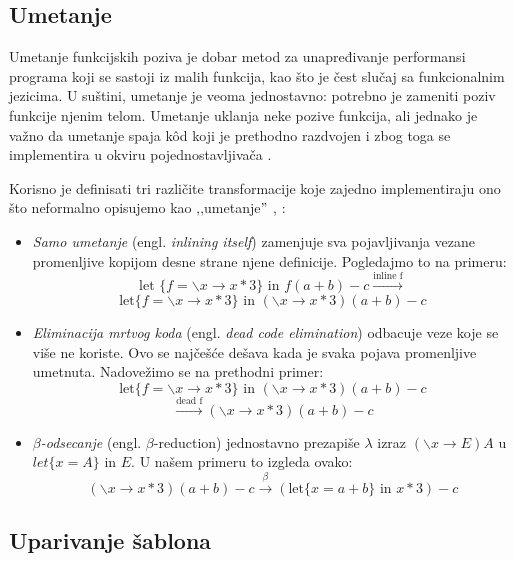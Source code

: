 \subsection{Umetanje}
Umetanje funkcijskih poziva je dobar metod za unapređivanje performansi programa koji se sastoji iz malih funkcija, kao što je čest slučaj sa funkcionalnim jezicima. U suštini, umetanje je veoma jednostavno: potrebno je zameniti poziv funkcije njenim telom. Umetanje uklanja neke pozive funkcija, ali jednako je važno da umetanje spaja k\^ od koji je prethodno razdvojen i zbog toga se implementira u okviru pojednostavljivača \cite{compilation-by-program-transformation}.

Korisno je definisati tri različite transformacije koje zajedno implementiraju ono što neformalno opisujemo kao ‚‚umetanje$"$ \cite{secrets-haskell-compiler-inliner, compilation-by-program-transformation}, :
\begin{itemize}
	\item \textit{Samo umetanje} (engl. \textit{inlining itself}) zamenjuje sva pojavljivanja vezane promenljive kopijom desne strane njene definicije. Pogledajmo to na primeru:
	$$ \text{let } \{ f = \backslash x \longrightarrow x*3 \} \text{ in } f (a + b) - c \stackrel{\text{inline f}}{\longrightarrow} $$
	$$\text{let} \{ f = \backslash x \longrightarrow x*3 \} \text{ in } (\backslash x \longrightarrow x*3) (a + b) - c$$
	
	\item \textit{Eliminacija mrtvog koda} (engl. \textit{dead code elimination}) odbacuje veze koje se više ne koriste. Ovo se najčešće dešava kada je svaka pojava promenljive umetnuta. Nadovežimo se na prethodni primer:
	$$\text{let} \{ f = \backslash x \longrightarrow x*3 \} \text{ in } (\backslash x \longrightarrow x*3) (a + b) - c $$ 
	$$\stackrel{\text{dead f}}{\longrightarrow}  (\backslash x \longrightarrow x*3) (a + b) - c $$
	
	\item \textit{$\beta$-odsecanje} (engl. \textit{$\beta$}-reduction) jednostavno prezapiše $\lambda$ izraz $(\backslash x \longrightarrow E) A$ u $let \{x = A\} \text{ in } E$. U našem primeru to izgleda ovako:
	$$(\backslash x \longrightarrow x*3) (a + b) - c \stackrel{\beta}{\longrightarrow} (\text{let} \{ x = a+b \} \text{ in } x*3) - c$$
\end{itemize}


\subsection{Uparivanje šablona}

